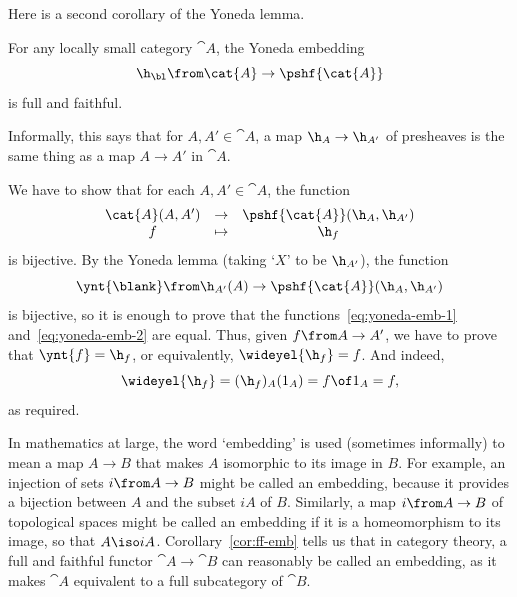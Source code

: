 %
%

Here is a second corollary of the Yoneda lemma.

\begin{cor}     
\label{cor:yoneda-ff}
For any locally small category $\cat{A}$, the Yoneda embedding
\[
\h_\bl\from \cat{A} \to \pshf{\cat{A}}
\]
is full and faithful.
\end{cor}

Informally, this says that for $A, A' \in \cat{A}$, a map $\h_A \to \h_{A'}$ of
presheaves is the same thing as a map $A \to A'$ in $\cat{A}$.

\begin{pf}
We have to show that for each $A, A' \in \cat{A}$, the function
% 
\begin{equation}        
\label{eq:yoneda-emb-1}
\begin{array}{ccc}
\cat{A}(A, A')  &\to            &\pshf{\cat{A}}(\h_A, \h_{A'})    \\
f               &\mapsto        &\h_f
\end{array}
\end{equation}
% 
is bijective.  By the Yoneda lemma (taking `$X$' to be $\h_{A'}$), the function
% 
\begin{equation}        
\label{eq:yoneda-emb-2}
\ynt{\blank}\from
\h_{A'}(A) \to \pshf{\cat{A}}(\h_A, \h_{A'})
\end{equation}
% 
is bijective, so it is enough to prove that the
functions~\eqref{eq:yoneda-emb-1} and~\eqref{eq:yoneda-emb-2} are equal.
Thus, given $f\from A \to A'$, we have to prove that $\ynt{f} = \h_f$, or
equivalently, $\wideyel{\h_f} = f$.  And indeed,
\[
\wideyel{\h_f}
=
(\h_f)_A(1_A)
=
f \of 1_A 
=
f,
\]
as required.
\end{pf}

In mathematics at large, the word `embedding'%
%
%
is used (sometimes informally) to mean a map $A \to B$ that makes $A$
isomorphic to its image in $B$.  For example, an injection of sets $i\from
A \to B$ might be called an embedding, because it provides a bijection
between $A$ and the subset $iA$ of $B$.  Similarly, a map $i\from A \to B$
of topological spaces might be called an embedding if it is a homeomorphism
to its image, so that $A \iso iA$.  Corollary~\ref{cor:ff-emb} tells us
that in category theory, a full and faithful functor $\cat{A} \to \cat{B}$
can reasonably be called an embedding, as it makes $\cat{A}$ equivalent to
a full subcategory of $\cat{B}$.

